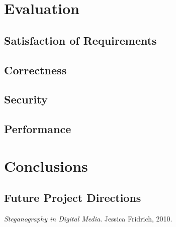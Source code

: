 \documentclass[paper=a4, fontsize=11pt,twoside]{scrartcl}    %
\numberwithin{table}{section}
\numberwithin{figure}{section}
\begin{document}
\section{Evaluation}
\subsection{Satisfaction of Requirements}
\subsection{Correctness}
\subsection{Security}
\subsection{Performance}

\section{Conclusions}
\subsection{Future Project Directions}


\begin{thebibliography}{1}

  \emph{Steganography in Digital Media}.
  Jessica Fridrich, 2010.

\end{thebibliography}
\end{document}

